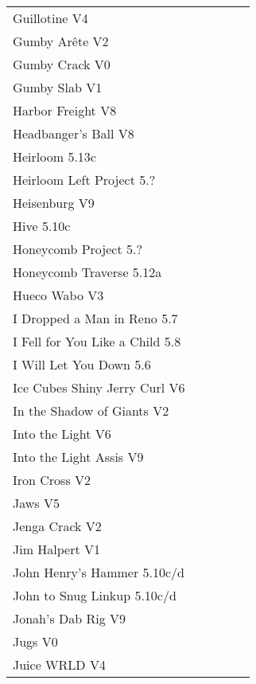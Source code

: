 \begin{flushleft}
\begin{center}
\begin{supertabular}{p{0.76\linewidth}p{0.08\linewidth}}
Guillotine V4 & \pageref{rt:Guillotine} \\
Gumby Arête V2 & \pageref{rt:Gumby Arête} \\
Gumby Crack V0 & \pageref{rt:Gumby Crack} \\
Gumby Slab V1 & \pageref{rt:Gumby Slab} \\
Harbor Freight V8 & \pageref{vr:Harbor Freight} \\
Headbanger's Ball V8 & \pageref{rt:Hanging Prow Project} \\
Heirloom 5.13c & \pageref{rt:Heirloom} \\
Heirloom Left Project 5.? & \pageref{vr:Heirloom Left Project} \\
Heisenburg V9 & \pageref{rt:Heisenburg} \\
Hive 5.10c & \pageref{rt:Hive} \\
Honeycomb Project 5.? & \pageref{rt:Honeycomb Project} \\
Honeycomb Traverse 5.12a & \pageref{vr:Honeycomb Traverse} \\
Hueco Wabo V3 & \pageref{rt:Hueco Wabo} \\
I Dropped a Man in Reno 5.7 & \pageref{rt:I Dropped a Man in Reno} \\
I Fell for You Like a Child 5.8 & \pageref{rt:I Fell for You Like a Child} \\
I Will Let You Down 5.6 & \pageref{rt:I Will Let You Down} \\
Ice Cubes Shiny Jerry Curl V6 & \pageref{rt:Ice Cubes Shiny Jerry Curl} \\
In the Shadow of Giants V2 & \pageref{rt:In the Shadow of Giants} \\
Into the Light V6 & \pageref{rt:Into the Light} \\
Into the Light Assis V9 & \pageref{vr:Into the Light Assis} \\
Iron Cross V2 & \pageref{vr:Iron Cross} \\
Jaws V5 & \pageref{rt:Jaws} \\
Jenga Crack V2 & \pageref{vr:Crack 2} \\
Jim Halpert V1 & \pageref{rt:Jim Halpert} \\
John Henry's Hammer 5.10c/d & \pageref{rt:John Henry's Hammer} \\
John to Snug Linkup 5.10c/d & \pageref{vr:John to Snug Linkup} \\
Jonah's Dab Rig V9 & \pageref{rt:Jonah's Dab Rig} \\
Jugs V0 & \pageref{rt:Jugs} \\
Juice WRLD V4 & \pageref{vr:Juice WRLD} \\

\end{supertabular}
\end{center}
\end{flushleft}
